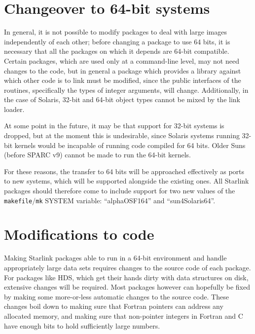 \documentclass[twoside,11pt]{article}
\newcommand{\xref}[3]{#1}
\renewcommand{\_}{\texttt{\symbol{95}}}
\newcommand{\file}[1]{{\tt #1}}
\begin{document}
\section{Changeover to 64-bit systems\label{sec:changeover}}

In general, it is not possible to modify packages to deal with large
images independently of each other;
before changing a package to use 64 bits, it is necessary 
that all the packages on which it depends are 64-bit compatible.
Certain packages, which are used only at a command-line level, 
may not need changes to the code, but in general 
a package which provides a library 
against which other code is to link must be modified,
since the public interfaces of the routines,
specifically the types of integer arguments, will change. 
Additionally, in the case of Solaris,
32-bit and 64-bit object types cannot be mixed by the link loader.

At some point in the future, it may be that support for 32-bit systems
is dropped, but at the moment this is undesirable, since 
Solaris systems running 32-bit kernels would be incapable of running
code compiled for 64 bits.  
Older Suns (before SPARC v9) cannot be made to run the 64-bit kernels.

For these reasons, the transfer to 64 bits will be approached
effectively as ports to new systems, which will be supported
alongside the existing ones.  All Starlink packages should
therefore come to 
include support for two new values of the \file{makefile}/\file{mk}
SYSTEM variable: ``alpha\_OSF1\_64'' and ``sun4\_Solaris\_64''.



\section{Modifications to code\label{sec:modificienda}}

Making Starlink packages able to run in a 64-bit environment and 
handle appropriately large data sets requires changes to the source
code of each package.
For packages like \xref{HDS}{sun92}{}, 
which get their hands dirty with data structures on disk,
extensive changes will be required.
Most packages however can hopefully be fixed by making some more-or-less
automatic changes to the source code.
These changes boil down to making sure that Fortran pointers 
can address any allocated memory,
and making sure that non-pointer integers in Fortran and C 
have enough bits to hold sufficiently large numbers.
\end{document}
